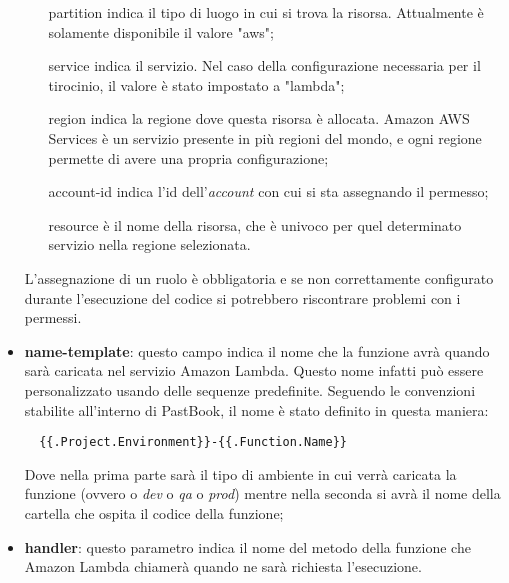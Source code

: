 \begin{itemize}
\begin{itemize}
    \item[partition] indica il tipo di luogo in cui si trova la risorsa.
Attualmente è solamente disponibile il valore "aws";

    \item[service] indica il servizio. Nel caso della configurazione necessaria
per il tirocinio, il valore è stato impostato a "lambda";

    \item[region] indica la regione dove questa risorsa è allocata. Amazon AWS
Services è un servizio presente in più regioni del mondo, e ogni regione
permette di avere una propria configurazione;

    \item[account-id] indica l'id dell'\textit{account} con cui si sta
assegnando il permesso;

    \item[resource] è il nome della risorsa, che è univoco per quel determinato
servizio nella regione selezionata.
  \end{itemize}
  L'assegnazione di un ruolo è obbligatoria e se non correttamente configurato
durante l'esecuzione del codice si potrebbero riscontrare problemi con i
permessi.

  \item \textbf{name-template}: questo campo indica il nome che la funzione
avrà quando sarà caricata nel servizio Amazon Lambda. Questo nome infatti può
essere personalizzato usando delle sequenze predefinite. Seguendo le
convenzioni stabilite all'interno di PastBook, il nome è stato definito in
questa maniera:
\begin{verbatim}
  {{.Project.Environment}}-{{.Function.Name}}
\end{verbatim}
Dove nella prima parte sarà il tipo di ambiente in cui verrà caricata la
funzione (ovvero o \textit{dev} o \textit{qa} o \textit{prod}) mentre nella
seconda si avrà il nome della cartella che ospita il codice della funzione;

  \item \textbf{handler}: questo parametro indica il nome del metodo della
funzione che Amazon Lambda chiamerà quando ne sarà richiesta l'esecuzione.
\end{itemize}
